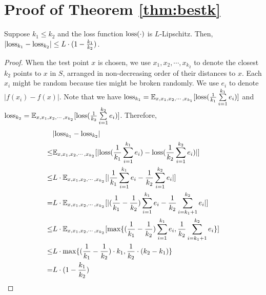 \section{Proof of Theorem \ref{thm:bestk}}
\label{sec:bestkproof}
\begin{lemma}
\label{lm:bestk}
Suppose $k_1\leq k_2$ and the loss function ${\mathrm{loss}}(\cdot)$ is $L$-Lipschitz. Then, $|{\mathrm{loss}}_{k_1}-{\mathrm{loss}}_{k_2}|\leq L\cdot(1-\frac{k_1}{k_2})$.
\end{lemma}
\begin{proof}
When the test point $x$ is chosen, we use $x_1,x_2,\cdots,x_{k_2}$ to denote the closest $k_2$ points to $x$ in $S$, arranged in non-decreasing order of their distances to $x$. Each $x_i$ might be random because ties might be broken randomly. We use $e_i$ to denote $|f(x_i)-f(x)|$. Note that we have ${\mathrm{loss}}_{k_1}=\mathbb E_{x,x_1,x_2,\cdots,x_{k_1}}[{\mathrm{loss}}(\frac{1}{k_1}\sum\limits_{i=1}^{k_1}e_i)]$ and ${\mathrm{loss}}_{k_2}=\mathbb E_{x,x_1,x_2,\cdots,x_{k_2}}[{\mathrm{loss}}(\frac{1}{k_2}\sum\limits_{i=1}^{k_2}e_i)]$. Therefore,
\begin{equation}
\begin{split}
&|{\mathrm{loss}}_{k_1}-{\mathrm{loss}}_{k_2}|\\
\leq &\mathbb E_{x,x_1,x_2,\cdots,x_{k_2}}[|{\mathrm{loss}}(\frac{1}{k_1}\sum\limits_{i=1}^{k_1}e_i)-{\mathrm{loss}}(\frac{1}{k_2}\sum\limits_{i=1}^{k_2}e_i)|]\\
\leq &L\cdot \mathbb E_{x,x_1,x_2,\cdots,x_{k_2}}[|\frac{1}{k_1}\sum\limits_{i=1}^{k_1}e_i-\frac{1}{k_2}\sum\limits_{i=1}^{k_2}e_i|]\\
= &L\cdot \mathbb E_{x,x_1,x_2,\cdots,x_{k_2}}[|(\frac{1}{k_1}-\frac{1}{k_2})\sum\limits_{i=1}^{k_1}e_i-\frac{1}{k_2}\sum\limits_{i=k_1+1}^{k_2}e_i|]\\
\leq &L\cdot \mathbb E_{x,x_1,x_2,\cdots,x_{k_2}}[\max\{(\frac{1}{k_1}-\frac{1}{k_2})\sum\limits_{i=1}^{k_1}e_i,\frac{1}{k_2}\sum\limits_{i=k_1+1}^{k_2}e_i\}]\\
\leq &L\cdot\max\{(\frac{1}{k_1}-\frac{1}{k_2})\cdot k_1,\frac{1}{k_2}\cdot(k_2-k_1)\}\\
=&L\cdot(1-\frac{k_1}{k_2})
\end{split}
\end{equation}
\end{proof}
